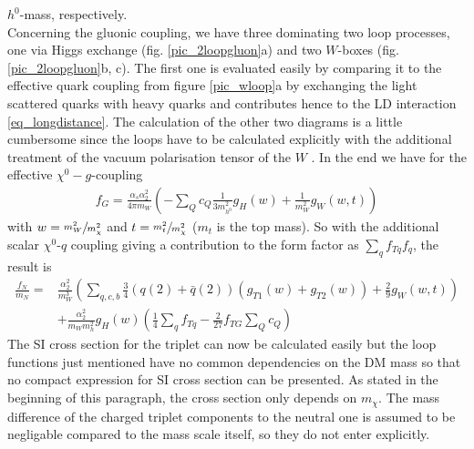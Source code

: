 $h^0$-mass, respectively.\\
\noindent Concerning the gluonic coupling, we have three dominating two loop processes, one via Higgs exchange (fig. \ref{pic_2loopgluon}a) and two
$W$-boxes (fig. \ref{pic_2loopgluon}b, c). The first one is evaluated easily by comparing it to the effective quark coupling from figure \ref{pic_wloop}a
by exchanging the light scattered quarks with heavy quarks and contributes hence to the LD interaction \eqref{eq_longdistance}. The calculation of 
the other two diagrams is a little cumbersome since the loops have to be calculated explicitly with the additional treatment of the vacuum polarisation
tensor of the $W$ \cite{1007.2601}. In the end we have for the effective $\chi^0-g$-coupling
\begin{align}
 f_G = \frac{\alpha_s\alpha_2^2}{4\pi m_W}\left(-\sum\limits_Q c_Q \frac{1}{3m_{h^0}^2} g_H(w) + \frac{1}{m_W^2} g_{W}(w,t) \right)
\end{align}
with $w=\sfrac{m_W^2}{m_\chi^2}$ and $t=\sfrac{m_t^2}{m_\chi^2}$ ($m_t$ is the top mass).
So with the additional scalar $\chi^0$-$q$ coupling giving a contribution to the form factor as $\sum_qf_{Tq}f_q$, the result is
\begin{align}
 \frac{f_N}{m_N} =& \frac{\alpha_2^2}{m_W^3}\left(\sum\limits_{q,c,b} \frac34 \left(q(2)+\bar q(2)\right) \left(g_{T1}(w) + g_{T2}(w)\right) + \frac29g_W(w,t)\right) \\
 \nonumber
 &+ \frac{\alpha_2^2}{m_W m_h^2}g_H(w) \left(\frac14 \sum\limits_q f_{Tq} - \frac{2}{27}f_{TG}\sum\limits_Q c_Q \right)
\end{align}
The SI cross section for the triplet can now be calculated easily but the loop functions just mentioned have no common dependencies on the DM mass
so that no compact expression for SI cross section can be presented. As stated in the beginning of this paragraph, the cross section only depends
on $m_\chi$. The mass difference of the charged triplet components to the neutral one is assumed to be negligable compared to the mass scale itself,
so they do not enter explicitly. 












